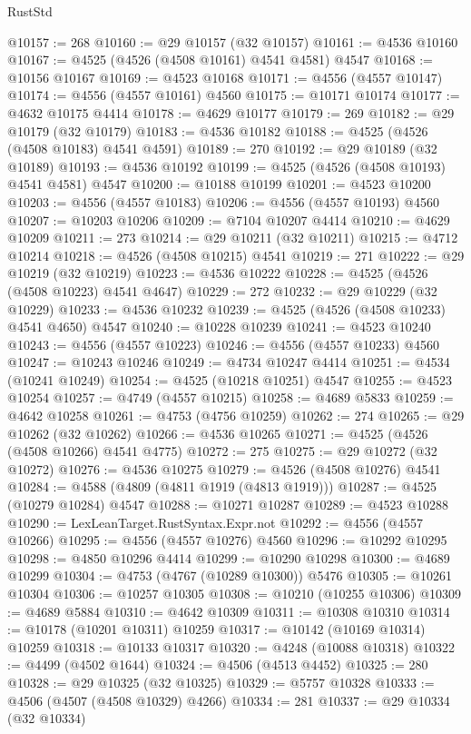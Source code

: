 \begin{lexlean}{RustStd}
\begin{coremodule}
{\begin{coremodule}
{{{{{{{{{{{{{{{{{{{{{{{{{{{{{{{{{{{{{{{{{{{{{{{{{{{{{{{@10157 := 268
@10160 := @29 @10157 (@32 @10157)
@10161 := @4536 @10160
@10167 := @4525 (@4526 (@4508 @10161) @4541 @4581) @4547
@10168 := @10156 @10167
@10169 := @4523 @10168
@10171 := @4556 (@4557 @10147)
@10174 := @4556 (@4557 @10161) @4560
@10175 := @10171 @10174
@10177 := @4632 @10175 @4414
@10178 := @4629 @10177
@10179 := 269
@10182 := @29 @10179 (@32 @10179)
@10183 := @4536 @10182
@10188 := @4525 (@4526 (@4508 @10183) @4541 @4591)
@10189 := 270
@10192 := @29 @10189 (@32 @10189)
@10193 := @4536 @10192
@10199 := @4525 (@4526 (@4508 @10193) @4541 @4581) @4547
@10200 := @10188 @10199
@10201 := @4523 @10200
@10203 := @4556 (@4557 @10183)
@10206 := @4556 (@4557 @10193) @4560
@10207 := @10203 @10206
@10209 := @7104 @10207 @4414
@10210 := @4629 @10209
@10211 := 273
@10214 := @29 @10211 (@32 @10211)
@10215 := @4712 @10214
@10218 := @4526 (@4508 @10215) @4541
@10219 := 271
@10222 := @29 @10219 (@32 @10219)
@10223 := @4536 @10222
@10228 := @4525 (@4526 (@4508 @10223) @4541 @4647)
@10229 := 272
@10232 := @29 @10229 (@32 @10229)
@10233 := @4536 @10232
@10239 := @4525 (@4526 (@4508 @10233) @4541 @4650) @4547
@10240 := @10228 @10239
@10241 := @4523 @10240
@10243 := @4556 (@4557 @10223)
@10246 := @4556 (@4557 @10233) @4560
@10247 := @10243 @10246
@10249 := @4734 @10247 @4414
@10251 := @4534 (@10241 @10249)
@10254 := @4525 (@10218 @10251) @4547
@10255 := @4523 @10254
@10257 := @4749 (@4557 @10215)
@10258 := @4689 @5833
@10259 := @4642 @10258
@10261 := @4753 (@4756 @10259)
@10262 := 274
@10265 := @29 @10262 (@32 @10262)
@10266 := @4536 @10265
@10271 := @4525 (@4526 (@4508 @10266) @4541 @4775)
@10272 := 275
@10275 := @29 @10272 (@32 @10272)
@10276 := @4536 @10275
@10279 := @4526 (@4508 @10276) @4541
@10284 := @4588 (@4809 (@4811 @1919 (@4813 @1919)))
@10287 := @4525 (@10279 @10284) @4547
@10288 := @10271 @10287
@10289 := @4523 @10288
@10290 := LexLeanTarget.RustSyntax.Expr.not
@10292 := @4556 (@4557 @10266)
@10295 := @4556 (@4557 @10276) @4560
@10296 := @10292 @10295
@10298 := @4850 @10296 @4414
@10299 := @10290 @10298
@10300 := @4689 @10299
@10304 := @4753 (@4767 (@10289 @10300)) @5476
@10305 := @10261 @10304
@10306 := @10257 @10305
@10308 := @10210 (@10255 @10306)
@10309 := @4689 @5884
@10310 := @4642 @10309
@10311 := @10308 @10310
@10314 := @10178 (@10201 @10311) @10259
@10317 := @10142 (@10169 @10314) @10259
@10318 := @10133 @10317
@10320 := @4248 (@10088 @10318)
@10322 := @4499 (@4502 @1644)
@10324 := @4506 (@4513 @4452)
@10325 := 280
@10328 := @29 @10325 (@32 @10325)
@10329 := @5757 @10328
@10333 := @4506 (@4507 (@4508 @10329) @4266)
@10334 := 281
@10337 := @29 @10334 (@32 @10334)
}}}}}}}}}}}}}}}}}}}}}}}}}}}}}}}}}}}}}}}}}}}}}}}}}}}}}}}
\end{coremodule}}
\end{coremodule}
\end{lexlean}
